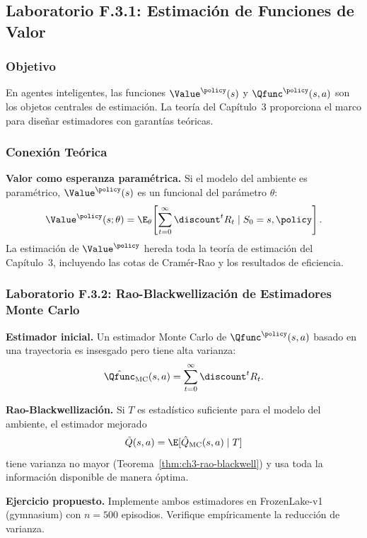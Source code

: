 \bigskip

\subsection*{Laboratorio F.3.1: Estimación de Funciones de Valor}
\label{lab:F3.1}

\subsubsection*{Objetivo}

En agentes inteligentes, las funciones $\Value^\policy(s)$ y $\Qfunc^\policy(s,a)$
son los objetos centrales de estimación. La teoría del Capítulo~3 proporciona
el marco para diseñar estimadores con garantías teóricas.

\subsubsection*{Conexión Teórica}

\textbf{Valor como esperanza paramétrica.} Si el modelo del ambiente es
paramétrico, $\Value^\policy(s)$ es un funcional del parámetro $\theta$:
\[
    \Value^\policy(s;\theta) = \E_\theta\!\left[\sum_{t=0}^\infty \discount^t R_t
    \mid S_0=s,\policy\right].
\]
La estimación de $\Value^\policy$ hereda toda la teoría de estimación del
Capítulo~3, incluyendo las cotas de Cramér-Rao y los resultados de eficiencia.

\subsubsection*{Laboratorio F.3.2: Rao-Blackwellización de Estimadores Monte Carlo}

\textbf{Estimador inicial.} Un estimador Monte Carlo de $\Qfunc^\policy(s,a)$
basado en una trayectoria es insesgado pero tiene alta varianza:
\[
    \hat{\Qfunc}_{\text{MC}}(s,a) = \sum_{t=0}^{\infty} \discount^t R_t.
\]

\textbf{Rao-Blackwellización.} Si $T$ es estadístico suficiente para el modelo
del ambiente, el estimador mejorado
\[
    \tilde{Q}(s,a) = \E[\hat{Q}_{\text{MC}}(s,a) \mid T]
\]
tiene varianza no mayor (Teorema~\ref{thm:ch3-rao-blackwell}) y usa toda
la información disponible de manera óptima.

\textbf{Ejercicio propuesto.} Implemente ambos estimadores en FrozenLake-v1
(gymnasium) con $n=500$ episodios. Verifique empíricamente la reducción de
varianza.

